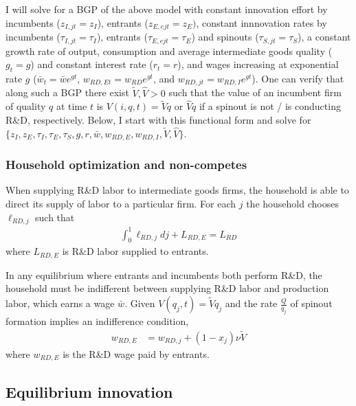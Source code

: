 \documentclass[12pt,english]{article}
\theoremstyle{remark}
\begin{document}
I will solve for a BGP of the above model with constant innovation effort by incumbents ($z_{I,jt} = z_I$), entrants ($z_{E,ejt} = z_{E})$, constant innnovation rates by incumbents ($\tau_{I,jt} = \tau_I$), entrants ($\tau_{E,ejt} = \tau_E$) and spinouts ($\tau_{S,jt} = \tau_S$), a constant growth rate of output, consumption and average intermediate goods quality ($g_t = g$) and constant interest rate ($r_t = r$), and wages increasing at exponential rate $g$ ($\bar{w}_t = \bar{w} e^{gt}$, $w_{RD,Et} = w_{RD}e^{gt}$, and $w_{RD,jt} = w_{RD,I}e^{gt}$). One can verify that along such a BGP there exist $\tilde{V},\hat{V} > 0$ such that the value of an incumbent firm of quality $q$ at time $t$ is $V(i,q,t) = \tilde{V} q$ or $\hat{V}q$ if a spinout is not / is conducting R\&D, respectively. Below, I start with this functional form and solve for $\{z_I,z_E,\tau_I,\tau_E,\tau_S,g,r,\bar{w},w_{RD,E},w_{RD,I},\tilde{V}, \hat{V}\}$.

\subsubsection{Household optimization and non-competes}

When supplying R\&D labor to intermediate goods firms, the household is able to direct its supply of labor to a particular firm. For each $j$ the household chooses $\ell_{RD,j}$ such that
\begin{align}
\int_0^1 \ell_{RD,j} dj + L_{RD,E} = L_{RD}
\end{align}
where $L_{RD,E}$ is R\&D labor supplied to entrants. 

In any equilibrium where entrants and incumbents both perform R\&D, the household must be indifferent between supplying R\&D labor and production labor, which earns a wage $\bar{w}$. Given $V(q_j,t) = \tilde{V}q_j$ and the rate $\frac{Q}{q_j}$ of spinout formation implies an indifference condition, 
\begin{align}
	w_{RD,E} &= w_{RD,j} + (1-x_j) \nu  \tilde{V} \label{eq:RD_worker_indifference}
\end{align}
where $w_{RD,E}$ is the R\&D wage paid by entrants.


\subsection{Equilibrium innovation}
\end{document}
